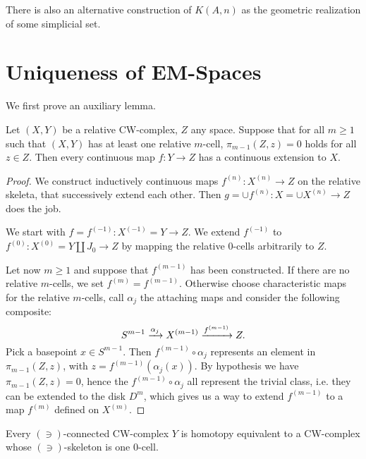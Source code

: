 There is also an alternative construction of $K(A,n)$ as the geometric realization of some simplicial set.

\section{Uniqueness of EM-Spaces}

We first prove an auxiliary lemma.

\begin{lemma}\label{theorem:extension-theorem}
Let $(X,Y)$ be a relative CW-complex, $Z$ any space. Suppose that for all $m\geq1$ such that $(X,Y)$ has at least one relative $m$-cell, $\pi_{m-1}(Z,z)=0$ holds for all $z\in Z$. Then every continuous map $f:Y\to Z$ has a continuous extension to $X$.
\end{lemma}

\begin{proof}
We construct inductively continuous maps $f^{(n)}:X^{(n)}\to Z$ on the relative skeleta, that successively extend each other. Then $g=\cup f^{(n)}:X=\cup X^{(n)}\to Z$ does the job.

We start with $f=f^{(-1)}:X^{(-1)}=Y\to Z$. We extend $f^{(-1)}$ to $f^{(0)}:X^{(0)}=Y\amalg J_0\to Z$ by mapping the relative $0$-cells arbitrarily to $Z$.

Let now $m\ge1$ and suppose that $f^{(m-1)}$ has been constructed. If there are no relative $m$-cells, we set $f^{(m)}=f^{(m-1)}$. Otherwise choose characteristic maps for the relative $m$-cells, call $\alpha_j$ the attaching maps and consider the following composite:
\[S^{m-1}\xrightarrow{\alpha_j}X^{(m-1)}\xrightarrow{ f^{(m-1)}}Z.\]
Pick a basepoint $x\in S^{m-1}$. Then $f^{(m-1)}\circ\alpha_j$ represents an element in $\pi_{m-1}(Z,z)$, with $z=f^{(m-1)}(\alpha_j(x))$. By hypothesis we have $\pi_{m-1}(Z,z)=0$, hence the $f^{(m-1)}\circ\alpha_j$ all represent the trivial class, i.e. they can be extended to the disk $D^m$, which gives us a way to extend $f^{(m-1)}$ to a map $f^{(m)}$ defined on $X^{(m)}$.
\end{proof}

\begin{theorem}\label{theorem:single-0-cell-complex}
Every $(\ni)$-connected CW-complex $Y$ is homotopy equivalent to a CW-complex whose $(\ni)$-skeleton is one $0$-cell.
\end{theorem}

